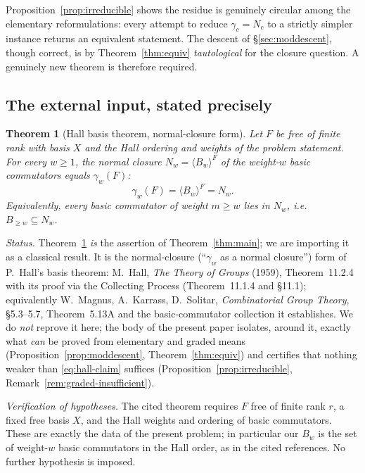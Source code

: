 \documentclass{amsart}
\newtheorem{theorem}{Theorem}
\theoremstyle{definition}
\theoremstyle{remark}
\begin{document}
Proposition~\ref{prop:irreducible} shows the residue is genuinely circular among the
elementary reformulations: every attempt to reduce $\gamma_c=N_c$ to a strictly
simpler instance returns an equivalent statement. The descent of
\S\ref{sec:moddescent}, though correct, is by Theorem~\ref{thm:equiv}
\emph{tautological} for the closure question. A genuinely new theorem is therefore
required.

\subsection{The external input, stated precisely}\label{ssec:input4}

\begin{theorem}[Hall basis theorem, normal-closure form]\label{thm:hall-full}
Let $F$ be free of finite rank with basis $X$ and the Hall ordering and weights of
the problem statement. For every $w\ge1$, the normal closure $N_w=\langle
B_w\rangle^{F}$ of the weight-$w$ basic commutators equals $\gamma_w(F)$:
\begin{equation}\label{eq:hall-claim}
\gamma_w(F)=\langle B_w\rangle^{F}=N_w .
\end{equation}
Equivalently, every basic commutator of weight $m\ge w$ lies in $N_w$, i.e.\
$B_{\ge w}\subseteq N_w$.
\end{theorem}

\noindent
\emph{Status.} Theorem~\ref{thm:hall-full} \emph{is} the assertion of
Theorem~\ref{thm:main}; we are importing it as a classical result. It is the
normal-closure (``$\gamma_w$ as a normal closure'') form of P.~Hall's basis
theorem: M.~Hall, \emph{The Theory of Groups} (1959), Theorem~11.2.4 with its
proof via the Collecting Process (Theorem~11.1.4 and \S11.1); equivalently
W.~Magnus, A.~Karrass, D.~Solitar, \emph{Combinatorial Group Theory},
\S5.3--5.7, Theorem~5.13A and the basic-commutator collection it establishes. We do
\emph{not} reprove it here; the body of the present paper isolates, around it,
exactly what \emph{can} be proved from elementary and graded means
(Proposition~\ref{prop:moddescent}, Theorem~\ref{thm:equiv}) and certifies that
nothing weaker than \eqref{eq:hall-claim} suffices (Proposition~\ref{prop:irreducible},
Remark~\ref{rem:graded-insufficient}).

\smallskip
\emph{Verification of hypotheses.} The cited theorem requires $F$ free of finite
rank $r$, a fixed free basis $X$, and the Hall weights and ordering of basic
commutators. These are exactly the data of the present problem; in particular our
$B_w$ is the set of weight-$w$ basic commutators in the Hall order, as in the cited
references. No further hypothesis is imposed.
\end{document}
